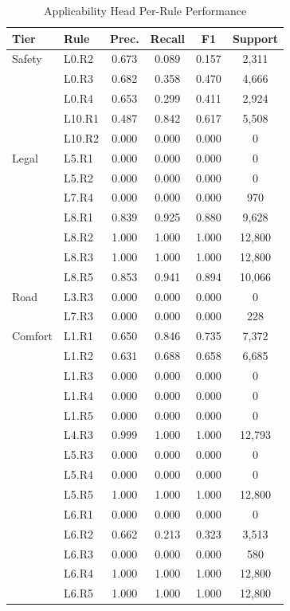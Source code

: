 \begin{table}[t]
\centering
\caption{Applicability Head Per-Rule Performance}
\label{tab:applicability_per_rule}
\begin{tabular}{llcccc}
\toprule
\textbf{Tier} & \textbf{Rule} & \textbf{Prec.} & \textbf{Recall} & \textbf{F1} & \textbf{Support} \\
\midrule
Safety & L0.R2 & 0.673 & 0.089 & 0.157 & 2,311 \\
 & L0.R3 & 0.682 & 0.358 & 0.470 & 4,666 \\
 & L0.R4 & 0.653 & 0.299 & 0.411 & 2,924 \\
 & L10.R1 & 0.487 & 0.842 & 0.617 & 5,508 \\
 & L10.R2 & 0.000 & 0.000 & 0.000 & 0 \\
\midrule
Legal & L5.R1 & 0.000 & 0.000 & 0.000 & 0 \\
 & L5.R2 & 0.000 & 0.000 & 0.000 & 0 \\
 & L7.R4 & 0.000 & 0.000 & 0.000 & 970 \\
 & L8.R1 & 0.839 & 0.925 & 0.880 & 9,628 \\
 & L8.R2 & 1.000 & 1.000 & 1.000 & 12,800 \\
 & L8.R3 & 1.000 & 1.000 & 1.000 & 12,800 \\
 & L8.R5 & 0.853 & 0.941 & 0.894 & 10,066 \\
\midrule
Road & L3.R3 & 0.000 & 0.000 & 0.000 & 0 \\
 & L7.R3 & 0.000 & 0.000 & 0.000 & 228 \\
\midrule
Comfort & L1.R1 & 0.650 & 0.846 & 0.735 & 7,372 \\
 & L1.R2 & 0.631 & 0.688 & 0.658 & 6,685 \\
 & L1.R3 & 0.000 & 0.000 & 0.000 & 0 \\
 & L1.R4 & 0.000 & 0.000 & 0.000 & 0 \\
 & L1.R5 & 0.000 & 0.000 & 0.000 & 0 \\
 & L4.R3 & 0.999 & 1.000 & 1.000 & 12,793 \\
 & L5.R3 & 0.000 & 0.000 & 0.000 & 0 \\
 & L5.R4 & 0.000 & 0.000 & 0.000 & 0 \\
 & L5.R5 & 1.000 & 1.000 & 1.000 & 12,800 \\
 & L6.R1 & 0.000 & 0.000 & 0.000 & 0 \\
 & L6.R2 & 0.662 & 0.213 & 0.323 & 3,513 \\
 & L6.R3 & 0.000 & 0.000 & 0.000 & 580 \\
 & L6.R4 & 1.000 & 1.000 & 1.000 & 12,800 \\
 & L6.R5 & 1.000 & 1.000 & 1.000 & 12,800 \\
\bottomrule
\end{tabular}
\end{table}
